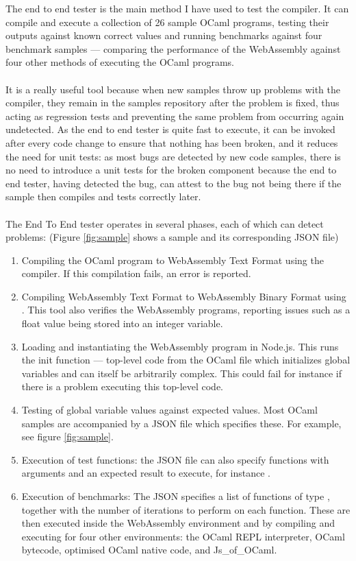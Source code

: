 The end to end tester is the main method I have used to test the compiler. It can compile and execute a collection of 26 sample OCaml programs, testing their outputs against known correct values and running benchmarks against four benchmark samples --- comparing the performance of the WebAssembly against four other methods of executing the OCaml programs.
\\\\
It is a really useful tool because when new samples throw up problems with the compiler, they remain in the samples repository after the problem is fixed, thus acting as regression tests and preventing the same problem from occurring again undetected. As the end to end tester is quite fast to execute, it can be invoked after every code change to ensure that nothing has been broken, and it reduces the need for unit tests: as most bugs are detected by new code samples, there is no need to introduce a unit tests for the broken component because the end to end tester, having detected the bug, can attest to the bug not being there if the sample then compiles and tests correctly later.
\\\\
The End To End tester operates in several phases, each of which can detect problems: (Figure \ref{fig:sample} shows a sample and its corresponding JSON file)
\begin{enumerate}
	\item Compiling the OCaml program to WebAssembly Text Format using the compiler. If this compilation fails, an error is reported.
	\item Compiling WebAssembly Text Format to WebAssembly Binary Format using . This tool also verifies the WebAssembly programs, reporting issues such as a float value being stored into an integer variable.
	\item Loading and instantiating the WebAssembly program in Node.js. This runs the init function --- top-level code from the OCaml file which initializes global variables and can itself be arbitrarily complex. This could fail for instance if there is a problem executing this top-level code.
	\item Testing of global variable values against expected values. Most OCaml samples are accompanied by a JSON file which specifies these. For example, see figure \ref{fig:sample}.
	\item Execution of test functions: the JSON file can also specify functions with arguments and an expected result to execute, for instance .
	\item Execution of benchmarks: The JSON specifies a list of functions of type , together with the number of iterations to perform on each function. These are then executed inside the WebAssembly environment and by compiling and executing for four other environments: the OCaml REPL interpreter, OCaml bytecode, optimised OCaml native code, and Js\_of\_OCaml.
\end{enumerate}
